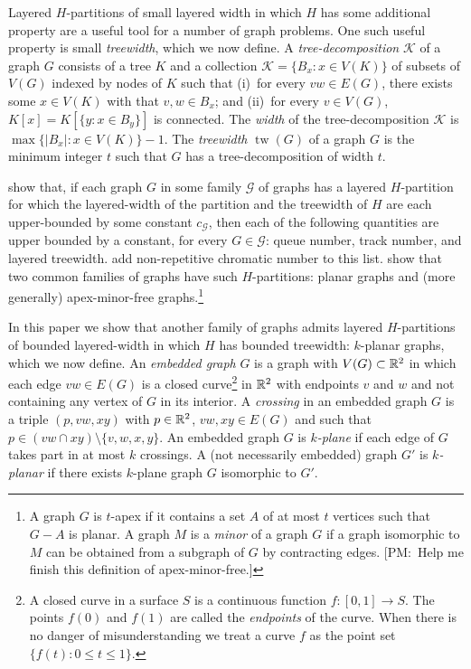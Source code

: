 \documentclass{patmorin}
\newcommand{\note}[2]{{\color{red}[#1:~#2]}}
\DeclareMathOperator{\tw}{tw}
\begin{document}
Layered $H$-partitions of small layered width in which $H$ has some additional property are a useful tool for a number of graph problems.  One such useful property is small \emph{treewidth}, which we now define. A \emph{tree-decomposition} $\mathcal{K}$ of a graph $G$ consists of a tree $K$ and a collection $\mathcal{K}=\{B_x:x\in V(K)\}$ of subsets of $V(G)$ indexed by nodes of $K$ such that (i)~for every $vw\in E(G)$, there exists some $x\in V(K)$ with that $v,w\in B_x$; and (ii)~for every $v\in V(G)$, $K[x] = K[\{y: x\in B_y\}]$ is connected.  The \emph{width} of the tree-decomposition $\mathcal{K}$ is $\max\{|B_x|:x\in V(K)\}-1$.  The \emph{treewidth} $\tw(G)$ of a graph $G$ is the minimum integer $t$ such that $G$ has a tree-decomposition of width $t$.  

 \citet{dujmovic.joret.ea:planar} show that, if each graph $G$ in some family $\mathcal{G}$ of graphs has a layered $H$-partition for which the layered-width of the partition and the treewidth of $H$ are each upper-bounded by some constant $c_\mathcal{G}$, then each of the following quantities are upper bounded by a constant, for every $G\in\mathcal{G}$: queue number, track number, and layered treewidth. \citet{dujmovic.esperet.ea:planar} add non-repetitive chromatic number to this list.  \citet{dujmovic.joret.ea:planar} show that two common families of graphs have such $H$-partitions: planar graphs and (more generally) apex-minor-free graphs.\footnote{A graph $G$ is $t$-apex if it contains a set $A$ of at most $t$ vertices such that $G-A$ is planar. A graph $M$ is a \textit{minor} of a graph $G$ if a graph isomorphic to $M$ can be obtained from a subgraph of $G$ by contracting edges. \note{PM}{Help me finish this definition of apex-minor-free.}}

In this paper we show that another family of graphs admits layered $H$-partitions of bounded layered-width in which $H$ has bounded treewidth: $k$-planar graphs, which we now define. An \emph{embedded graph} $G$ is a graph with $V(G)\subset\mathbb{R}^2$ in which each edge $vw\in E(G)$ is a closed curve\footnote{A closed curve in a surface $S$ is a continuous function $f:[0,1]\to S$. The points $f(0)$ and $f(1)$ are called the \emph{endpoints} of the curve.  When there is no danger of misunderstanding we treat a curve $f$ as the point set $\{f(t):0\le t\le 1\}$.} in $\mathbb{R}^2$ with endpoints $v$ and $w$ and not containing any vertex of $G$ in its interior.  A \emph{crossing} in an embedded graph $G$ is a triple $(p,vw,xy)$ with $p\in\mathbb{R}^2$, $vw,xy\in E(G)$ and such that $p\in (vw\cap xy)\setminus\{v,w,x,y\}$. An embedded graph $G$ is \emph{$k$-plane} if each edge of $G$ takes part in at most $k$ crossings.  A (not necessarily embedded) graph $G'$ is \emph{$k$-planar} if there exists $k$-plane graph $G$ isomorphic to $G'$.  
\end{document}
